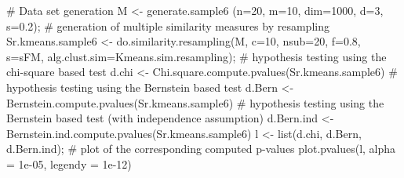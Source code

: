\documentclass{article}
\begin{document}
\begin{Examples}
\begin{ExampleCode}
# Data set generation
M <- generate.sample6 (n=20, m=10, dim=1000, d=3, s=0.2);
# generation of multiple similarity measures by resampling
Sr.kmeans.sample6 <- do.similarity.resampling(M, c=10, nsub=20, f=0.8, s=sFM, 
                                      alg.clust.sim=Kmeans.sim.resampling); 
# hypothesis testing using the chi-square based test
d.chi <- Chi.square.compute.pvalues(Sr.kmeans.sample6)
# hypothesis testing using the Bernstein based test
d.Bern <- Bernstein.compute.pvalues(Sr.kmeans.sample6)
# hypothesis testing using the Bernstein based test (with independence assumption)
d.Bern.ind <- Bernstein.ind.compute.pvalues(Sr.kmeans.sample6)
l <- list(d.chi, d.Bern, d.Bern.ind);
# plot of the corresponding computed p-values
plot.pvalues(l, alpha = 1e-05, legendy = 1e-12)
\end{ExampleCode}
\end{Examples}
\end{document}
